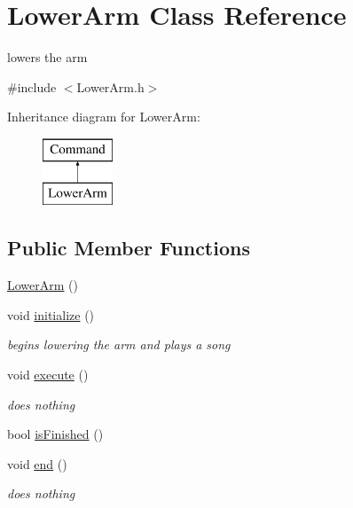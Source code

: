\hypertarget{classLowerArm}{\section{Lower\-Arm Class Reference}
\label{classLowerArm}
}


lowers the arm  




{\ttfamily \#include $<$Lower\-Arm.\-h$>$}

Inheritance diagram for Lower\-Arm\-:\begin{figure}[H]
\begin{center}
\leavevmode
\includegraphics[height=2.000000cm]{classLowerArm}
\end{center}
\end{figure}
\subsection*{Public Member Functions}
\begin{DoxyCompactItemize}
\item 
\hyperlink{classLowerArm_a94252e4c3f22881def50fb2415649f21}{Lower\-Arm} ()
\item 
void \hyperlink{classLowerArm_a4fe99e8f0cdb3526e3847823f69a60b8}{initialize} ()
\begin{DoxyCompactList}\small\item\em begins lowering the arm and plays a song \end{DoxyCompactList}\item 
void \hyperlink{classLowerArm_aca65c2ae64b1ff601213b1ed38ddf8b0}{execute} ()
\begin{DoxyCompactList}\small\item\em does nothing \end{DoxyCompactList}\item 
bool \hyperlink{classLowerArm_ad7bb0aadf698f341d737ccefdb015ce2}{is\-Finished} ()
\item 
void \hyperlink{classLowerArm_aa46179794b13132a2a353f24c785db37}{end} ()
\begin{DoxyCompactList}\small\item\em does nothing \end{DoxyCompactList}\end{DoxyCompactItemize}
